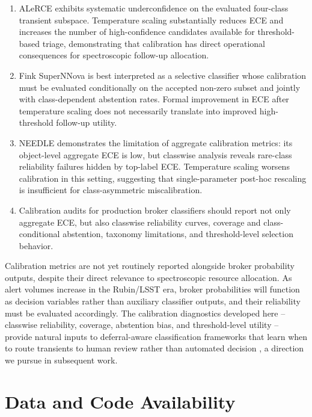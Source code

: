 \documentclass[a4paper,fleqn,usenatbib]{mnras}
\begin{document}
\begin{enumerate}

\item ALeRCE exhibits systematic underconfidence on the evaluated
four-class transient subspace. Temperature scaling substantially
reduces ECE and increases the number of high-confidence candidates
available for threshold-based triage, demonstrating that
calibration has direct operational consequences for spectroscopic
follow-up allocation.

\item Fink SuperNNova is best interpreted as a selective
classifier whose calibration must be evaluated conditionally on
the accepted non-zero subset and jointly with class-dependent
abstention rates. Formal improvement in ECE after temperature
scaling does not necessarily translate into improved
high-threshold follow-up utility.

\item NEEDLE demonstrates the limitation of aggregate calibration
metrics: its object-level aggregate ECE is low, but classwise
analysis reveals rare-class reliability failures hidden by
top-label ECE. Temperature scaling worsens calibration in this
setting, suggesting that single-parameter post-hoc rescaling is
insufficient for class-asymmetric miscalibration.

\item Calibration audits for production broker classifiers should
report not only aggregate ECE, but also classwise reliability
curves, coverage and class-conditional abstention, taxonomy
limitations, and threshold-level selection behavior.

\end{enumerate}

Calibration metrics are not yet routinely reported alongside
broker probability outputs, despite their direct relevance to
spectroscopic resource allocation. As alert volumes increase in
the Rubin/LSST era, broker probabilities will function as
decision variables rather than auxiliary classifier outputs, and
their reliability must be evaluated accordingly. The calibration
diagnostics developed here -- classwise reliability, coverage,
abstention bias, and threshold-level utility -- provide natural
inputs to deferral-aware classification frameworks that learn
when to route transients to human review rather than automated
decision \citep{madras2018, mozannar2020}, a direction we pursue
in subsequent work.

\section*{Data and Code Availability}
\end{document}
